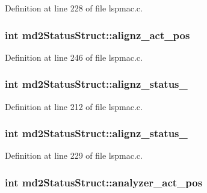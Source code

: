 Definition at line 228 of file lspmac.\-c.

\hypertarget{structmd2StatusStruct_a480f892fe91b05b2980fb00064807e2b}{
\subsubsection[{alignz\-\_\-act\-\_\-pos}]{\setlength{\rightskip}{0pt plus 5cm}int md2\-Status\-Struct\-::alignz\-\_\-act\-\_\-pos}}\label{structmd2StatusStruct_a480f892fe91b05b2980fb00064807e2b}


Definition at line 246 of file lspmac.\-c.

\hypertarget{structmd2StatusStruct_aadbfac5709de57e449a37e2937d6ade7}{
\subsubsection[{alignz\-\_\-status\-\_\-1}]{\setlength{\rightskip}{0pt plus 5cm}int md2\-Status\-Struct\-::alignz\-\_\-status\-\_}}\label{structmd2StatusStruct_aadbfac5709de57e449a37e2937d6ade7}


Definition at line 212 of file lspmac.\-c.

\hypertarget{structmd2StatusStruct_ac378da16eeaab2bc47f3f8f88f7411ed}{
\subsubsection[{alignz\-\_\-status\-\_\-2}]{\setlength{\rightskip}{0pt plus 5cm}int md2\-Status\-Struct\-::alignz\-\_\-status\-\_}}\label{structmd2StatusStruct_ac378da16eeaab2bc47f3f8f88f7411ed}


Definition at line 229 of file lspmac.\-c.

\hypertarget{structmd2StatusStruct_a49d1151b0e819646587be0ca9c9d612a}{
\subsubsection[{analyzer\-\_\-act\-\_\-pos}]{\setlength{\rightskip}{0pt plus 5cm}int md2\-Status\-Struct\-::analyzer\-\_\-act\-\_\-pos}}\label{structmd2StatusStruct_a49d1151b0e819646587be0ca9c9d612a}


